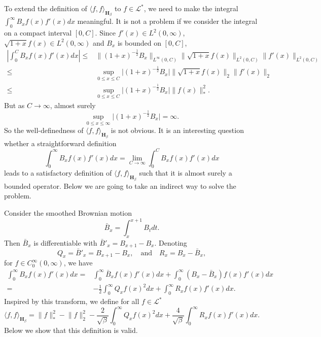 \documentclass[11pt, a4paper]{article}
\numberwithin{equation}{section}
\newcommand{\Lstar}{\mathcal{L}^*}
\newcommand{\Hbeta}{\mathbf{H}_{\beta}}
\theoremstyle{definition}
\theoremstyle{remark}
\begin{document}
To extend the definition of $\langle f, f \rangle_{\Hbeta}$ to $f \in \Lstar$, we need to make the integral $\int^{\infty}_0 B_x f(x) f'(x) dx$ meaningful. It is not a problem if we consider the integral on a compact interval $[0, C]$. Since $f'(x) \in L^2(0, \infty)$, $\sqrt{1 + x}f(x) \in L^2(0, \infty)$ and $B_x$ is bounded on $[0, C]$,
\begin{equation}
  \begin{split}
    \left\lvert \int^C_0 B_x f(x) f'(x) dx \right\rvert \leq {}& \lVert (1 + x)^{-\frac{1}{2}} B_x \rVert_{L^{\infty}(0, C)} \lVert \sqrt{1 + x} f(x) \rVert_{L^2(0, C)} \lVert f'(x) \rVert_{L^2(0, C)} \\
    \leq {}& \sup_{0 \leq x \leq C} \lvert (1 + x)^{-\frac{1}{2}} B_x \rvert \lVert \sqrt{1 + x} f(x) \rVert_2 \lVert f'(x) \rVert_2 \\
    \leq {}& \sup_{0 \leq x \leq C} \lvert (1 + x)^{-\frac{1}{2}} B_x \rvert \lVert f(x) \rVert^2_*.
  \end{split}
\end{equation}
But as $C \to \infty$, almost surely
\begin{equation}
  \sup_{0 \leq x \leq \infty} \lvert (1 + x)^{-\frac{1}{2}} B_x \rvert = \infty.
\end{equation}
So the well-definedness of $\langle f, f \rangle_{\Hbeta}$ is not obvious. It is an interesting question whether a straightforward definition
\begin{equation}
  \int^{\infty}_0 B_x f(x) f'(x) dx = \lim_{C \to \infty} \int^C_0 B_x f(x) f'(x) dx
\end{equation}
leads to a satisfactory definition of $\langle f, f \rangle_{\Hbeta}$ such that it is almost surely a bounded operator. Below we are going to take an indirect way to solve the problem.

Consider the smoothed Brownian motion
\begin{equation}
  \bar{B}_x = \int^{x + 1}_x B_t dt.
\end{equation}
Then $\bar{B}_x$ is differentiable with $\bar{B}'_x = B_{x + 1} - B_x$. Denoting
\begin{equation} \label{eq:defn_Q_x_R_x}
  Q_x = \bar{B}'_x = B_{x + 1} - B_x, \quad \text{and} \quad R_x = B_x - \bar{B}_x,
\end{equation}
for $f \in C^{\infty}_0(0, \infty)$, we have
\begin{equation}
  \begin{split}
    \int^{\infty}_0 B_x f(x) f'(x) dx = {}& \int^{\infty}_0 \bar{B}_x f(x)f'(x) dx + \int^{\infty}_0 (B_x - \bar{B}_x) f(x)f'(x) dx \\
    = {}& -\frac{1}{2} \int^{\infty}_0 Q_x f(x)^2 dx + \int^{\infty}_0 R_x f(x)f'(x) dx.
  \end{split}
\end{equation}
Inspired by this transform, we define for all $f \in \Lstar$
\begin{equation} \label{eq:rigorous_defn_of_inner_prod}
  \langle f, f \rangle_{\Hbeta} = \lVert f \rVert^2_* - \lVert f \rVert^2_2 - \frac{2}{\sqrt{\beta}} \int^{\infty}_0 Q_x f(x)^2 dx + \frac{4}{\sqrt{\beta}} \int^{\infty}_0 R_x f(x)f'(x) dx.
\end{equation}
Below we show that this definition is valid.
\end{document}
